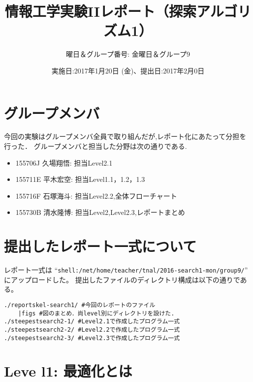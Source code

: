 \documentclass[uplatex,10pt]{jsarticle}
\begin{document}
\title{情報工学実験IIレポート（探索アルゴリズム1）}
\author{曜日＆グループ番号: 金曜日＆グループ9} %
\date{実施日:2017年1月20日 (金)、提出日:2017年2月0日}

\maketitle


\section*{グループメンバ}
今回の実験はグループメンバ全員で取り組んだが,レポート化にあたって分担を行った．
グループメンバと担当した分野は次の通りである.
\begin{itemize}
 \item 155706J 久場翔悟: 担当Level2.1
 \item 155711E 平木宏空: 担当Level1.1，1.2，1.3
 \item 155716F 石塚海斗: 担当Level2.2,全体フローチャート
 \item 155730B 清水隆博: 担当Level2,Level2.3,レポートまとめ
\end{itemize}

\section*{提出したレポート一式について}
レポート一式は
``\verb|shell:/net/home/teacher/tnal/2016-search1-mon/group9/|''
にアップロードした。
提出したファイルのディレクトリ構成は以下の通りである。

\vspace{+0.5cm}
\begin{breakbox}
\begin{verbatim}
./reportskel-search1/ #今回のレポートのファイル
    |figs #図のまとめ．尚level別にディレクトリを設けた.
./steepestsearch2-1/ #Level2.1で作成したプログラム一式
./steepestsearch2-2/ #Level2.2で作成したプログラム一式
./steepestsearch2-3/ #Level2.3で作成したプログラム一式
\end{verbatim}
\end{breakbox}

\newpage

\section{Leve l1: 最適化とは}




\newpage
\end{document}
